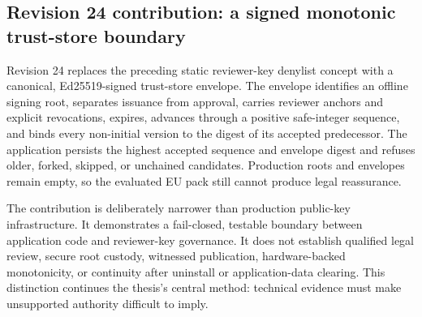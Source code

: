 

\subsection{Revision 24 contribution: a signed monotonic trust-store boundary}

Revision 24 replaces the preceding static reviewer-key denylist concept with a canonical, Ed25519-signed trust-store envelope. The envelope identifies an offline signing root, separates issuance from approval, carries reviewer anchors and explicit revocations, expires, advances through a positive safe-integer sequence, and binds every non-initial version to the digest of its accepted predecessor. The application persists the highest accepted sequence and envelope digest and refuses older, forked, skipped, or unchained candidates. Production roots and envelopes remain empty, so the evaluated EU pack still cannot produce legal reassurance.

The contribution is deliberately narrower than production public-key infrastructure. It demonstrates a fail-closed, testable boundary between application code and reviewer-key governance. It does not establish qualified legal review, secure root custody, witnessed publication, hardware-backed monotonicity, or continuity after uninstall or application-data clearing. This distinction continues the thesis's central method: technical evidence must make unsupported authority difficult to imply.
